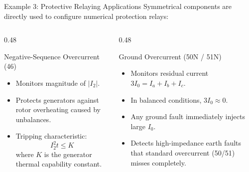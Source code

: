 \begin{frame}{Example 3: Protective Relaying Applications}
    Symmetrical components are directly used to configure numerical protection relays:
    \vfill
    \begin{columns}
        \begin{column}{0.48\textwidth}
            \begin{block}{Negative-Sequence Overcurrent (46)}
                \begin{itemize}
                    \item Monitors magnitude of $|I_2|$.
                    \item Protects generators against rotor overheating caused by unbalances.
                    \item Tripping characteristic:
                    \begin{equation}
                        I_2^2 t \le K
                    \end{equation}
                    where $K$ is the generator thermal capability constant.
                \end{itemize}
            \end{block}
        \end{column}

        \begin{column}{0.48\textwidth}
            \begin{block}{Ground Overcurrent (50N / 51N)}
                \begin{itemize}
                    \item Monitors residual current $3 I_0 = I_a + I_b + I_c$.
                    \item In balanced conditions, $3 I_0 \approx 0$.
                    \item Any ground fault immediately injects large $I_0$.
                    \item Detects high-impedance earth faults that standard overcurrent (50/51) misses completely.
                \end{itemize}
            \end{block}
        \end{column}
    \end{columns}
\end{frame}


